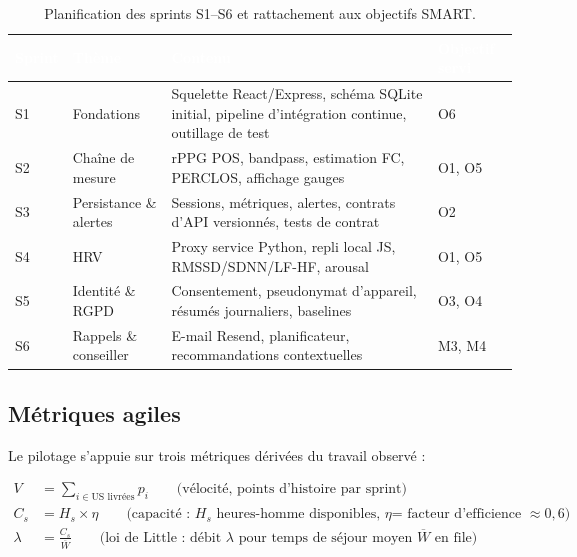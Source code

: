 \documentclass[11pt,a4paper]{article}
\begin{document}
\begin{table}[H]
\centering\small
\begin{tabularx}{\linewidth}{>{\raggedright\arraybackslash}p{1.5cm} p{2.2cm} X p{3.1cm}}
\toprule
\rowcolor{cwblue} \textcolor{white}{\bf Sprint} & \textcolor{white}{\bf Thème} & \textcolor{white}{\bf Contenu} &
\textcolor{white}{\bf Objectif servi} \\
\midrule
S1 & Fondations & Squelette React/Express, schéma SQLite initial, pipeline d'intégration
 continue, outillage de test & O6 \\
S2 & Chaîne de mesure & rPPG POS, bandpass, estimation FC, PERCLOS, affichage gauges & O1, O5 \\
S3 & Persistance \& alertes & Sessions, métriques, alertes, contrats d'API versionnés, tests de
 contrat & O2 \\
S4 & HRV & Proxy service Python, repli local JS, RMSSD/SDNN/LF-HF, arousal & O1, O5 \\
S5 & Identité \& RGPD & Consentement, pseudonymat d'appareil, résumés journaliers, baselines &
 O3, O4 \\
S6 & Rappels \& conseiller & E-mail Resend, planificateur, recommandations contextuelles & M3, M4 \\
\bottomrule
\end{tabularx}
\caption{Planification des sprints S1--S6 et rattachement aux objectifs SMART.}
\label{tab:sprints}
\end{table}

\subsection{Métriques agiles}
Le pilotage s'appuie sur trois métriques dérivées du travail observé :

\begin{align}
 V &= \sum_{i \in \text{US livrées}} p_i
 \qquad\text{(vélocité, points d'histoire par sprint)}
 \label{eq:velocite}\\[4pt]
 C_s &= H_s \times \eta
 \qquad\text{(capacité : } H_s \text{ heures-homme disponibles, } \eta \text{= facteur d'efficience } \approx 0{,}6\text{)}
 \label{eq:capacite}\\[4pt]
 \lambda &= \frac{C_s}{\overline{W}}
 \qquad\text{(loi de Little : débit } \lambda \text{ pour temps de séjour moyen } \overline{W} \text{ en file)}
 \label{eq:little}
\end{align}
\end{document}
